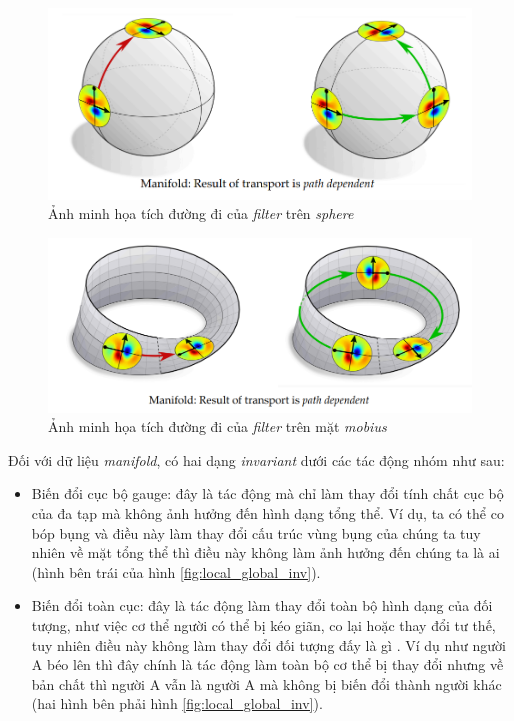 \begin{figure}[H]
    \centering
    \includegraphics[width=1\linewidth]{Images/GDL/manifold_mesh/sp_cnn_ex.png}
    \caption{Ảnh minh họa tích đường đi của \textit{filter} trên \textit{sphere}\cite{geometricdeep2022}}
    \label{fig:sp_cnn_ex}
\end{figure}

\begin{figure}[H]
    \centering
    \includegraphics[width=1\linewidth]{Images/GDL/manifold_mesh/mobius_ex.png}
    \caption{Ảnh minh họa tích đường đi của \textit{filter} trên mặt \textit{mobius}\cite{geometricdeep2022}}
    \label{fig:mobius_ex}
\end{figure}

Đối với dữ liệu \textit{manifold}, có hai dạng \textit{invariant} dưới các tác động nhóm như sau:
\begin{itemize}
    \item Biến đổi cục bộ gauge: đây là tác động mà chỉ làm thay đổi tính chất cục bộ của đa tạp mà không ảnh hưởng đến hình dạng tổng thể\cite{geometricdeep2022}. Ví dụ, ta có thể co bóp bụng và điều này làm thay đổi cấu trúc vùng bụng của chúng ta tuy nhiên về mặt tổng thể thì điều này không làm ảnh hưởng đến chúng ta là ai (hình bên trái của hình \ref{fig:local_global_inv}).

    \item Biến đổi toàn cục: đây là tác động làm thay đổi toàn bộ hình dạng của đối tượng, như việc cơ thể người có thể bị kéo giãn, co lại hoặc thay đổi tư thế, tuy nhiên điều này không làm thay đổi đối tượng đấy là gì \cite{geometricdeep2022}. Ví dụ như người A béo lên thì đây chính là tác động làm toàn bộ cơ thể bị thay đổi nhưng về bản chất thì người A vẫn là người A mà không bị biến đổi thành người khác (hai hình bên phải hình \ref{fig:local_global_inv}).
\end{itemize}

